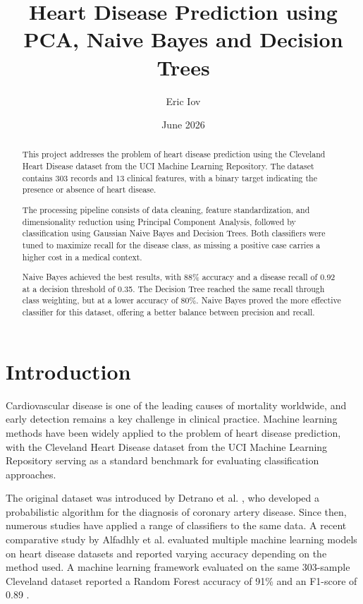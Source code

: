 \documentclass{article}
\title{Heart Disease Prediction using PCA, Naive Bayes and Decision Trees}
\author{Eric Iov}
\date{June 2026}
\begin{document}
\maketitle

\begin{abstract}
This project addresses the problem of heart disease prediction using the Cleveland Heart Disease dataset from the UCI Machine Learning Repository. The dataset contains 303 records and 13 clinical features, with a binary target indicating the presence or absence of heart disease.

The processing pipeline consists of data cleaning, feature standardization, and dimensionality reduction using Principal Component Analysis, followed by classification using Gaussian Naive Bayes and Decision Trees. Both classifiers were tuned to maximize recall for the disease class, as missing a positive case carries a higher cost in a medical context.

Naive Bayes achieved the best results, with 88\% accuracy and a disease recall of 0.92 at a decision threshold of 0.35. The Decision Tree reached the same recall through class weighting, but at a lower accuracy of 80\%. Naive Bayes proved the more effective classifier for this dataset, offering a better balance between precision and recall.
\end{abstract}

\section{Introduction}

Cardiovascular disease is one of the leading causes of mortality worldwide, and early detection remains a key challenge in clinical practice. Machine learning methods have been widely applied to the problem of heart disease prediction, with the Cleveland Heart Disease dataset from the UCI Machine Learning Repository serving as a standard benchmark for evaluating classification approaches.

The original dataset was introduced by Detrano et al. \cite{detrano1989}, who developed a probabilistic algorithm for the diagnosis of coronary artery disease. Since then, numerous studies have applied a range of classifiers to the same data. A recent comparative study by Alfadhly et al. \cite{alfadhly2025} evaluated multiple machine learning models on heart disease datasets and reported varying accuracy depending on the method used. A machine learning framework evaluated on the same 303-sample Cleveland dataset reported a Random Forest accuracy of 91\% and an F1-score of 0.89 \cite{mlframework2025}.
\end{document}
